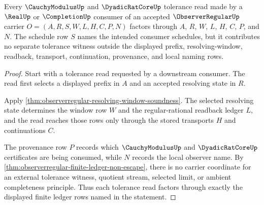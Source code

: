 \begin{theorem}
\label{thm:observerregular-resolving-window-ledger-exactness}
Every $\CauchyModulusUp$ and $\DyadicRatCoreUp$ tolerance read made by a $\RealUp$ or $\CompletionUp$ consumer of an accepted $\ObserverRegularUp$ carrier $O=(A,R,S,W,L,H,C,P,N)$ factors through $A$, $R$, $W$, $L$, $H$, $C$, $P$, and $N$. The schedule row $S$ names the intended consumer schedules, but it contributes no separate tolerance witness outside the displayed prefix, resolving-window, readback, transport, continuation, provenance, and local naming rows.
\end{theorem}
\begin{proof}
Start with a tolerance read requested by a downstream consumer. The read first selects a displayed prefix in $A$ and an accepted resolving state in $R$.

Apply \autoref{thm:observerregular-resolving-window-soundness}. The selected resolving state determines the window row $W$ and the regular-rational readback ledger $L$, and the read reaches those rows only through the stored transports $H$ and continuations $C$.

The provenance row $P$ records which $\CauchyModulusUp$ and $\DyadicRatCoreUp$ certificates are being consumed, while $N$ records the local observer name. By \autoref{thm:observerregular-finite-ledger-non-escape}, there is no carrier coordinate for an external tolerance witness, quotient stream, selected limit, or ambient completeness principle. Thus each tolerance read factors through exactly the displayed finite ledger rows named in the statement.
\end{proof}

